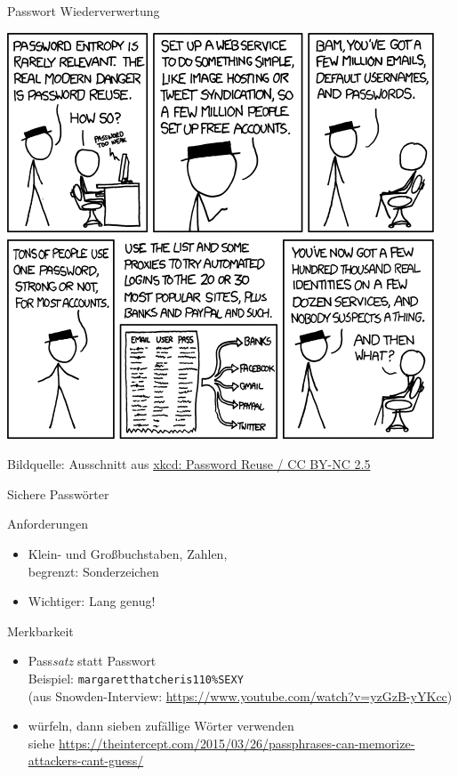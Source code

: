 \begin{frame}{Passwort Wiederverwertung}
  \begin{center}
    \includegraphics[height=0.8\textheight]{images/password_reuse_top.png}\\
  \end{center}
  \tiny Bildquelle: Ausschnitt aus \href{http://xkcd.com/792/}{xkcd: Password Reuse / CC BY-NC 2.5}
\end{frame}

\begin{frame}{Sichere Passwörter}
  \begin{block}{Anforderungen}
  \begin{itemize}
    \item Klein- und Großbuchstaben, Zahlen,\\ begrenzt: Sonderzeichen
    \item Wichtiger: Lang genug!
  \end{itemize}
  \end{block}
  \begin{block}{Merkbarkeit}
  \begin{itemize}
    \item Pass\emph{satz} statt Passwort\\
      Beispiel: \texttt{margaretthatcheris110\%SEXY}\\
      {\scriptsize (aus Snowden-Interview: \url{https://www.youtube.com/watch?v=yzGzB-yYKcc})}
    \item würfeln, dann sieben zufällige Wörter verwenden\\
      {\scriptsize siehe \url{https://theintercept.com/2015/03/26/passphrases-can-memorize-attackers-cant-guess/}}
  \end{itemize}
  \end{block}
\end{frame}

